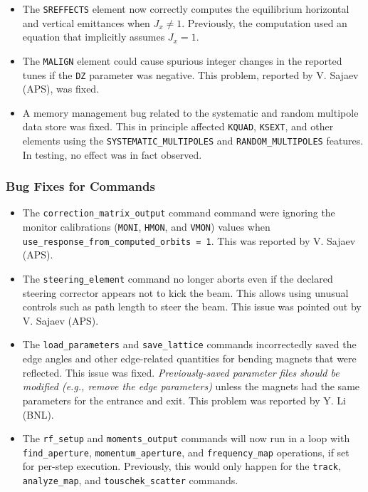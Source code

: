 \documentclass[11pt]{article}
\begin{document}
\begin{itemize}
\item The \verb|SREFFECTS| element now correctly computes the equilibrium horizontal and vertical emittances when
  $J_x \neq 1$. Previously, the computation used an equation that implicitly assumes $J_x = 1$.
\item The \verb|MALIGN| element could cause spurious integer changes in the reported tunes if the \verb|DZ| parameter
  was negative. This problem, reported by V. Sajaev (APS), was fixed.
\item A memory management bug related to the systematic and random multipole data store was fixed. This in principle
  affected \verb|KQUAD|, \verb|KSEXT|, and other elements using the \verb|SYSTEMATIC_MULTIPOLES| and \verb|RANDOM_MULTIPOLES|
  features. In testing, no effect was in fact observed.
\end{itemize}

\subsubsection{Bug Fixes for Commands}
\begin{itemize}
\item The \verb|correction_matrix_output| command command were ignoring the monitor calibrations
  (\verb|MONI|, \verb|HMON|, and \verb|VMON|) values when \verb|use_response_from_computed_orbits = 1|.
  This was reported by V. Sajaev (APS).
\item The \verb|steering_element| command no longer aborts even if the declared steering corrector appears 
  not to kick the beam. This allows using unusual controls such as path length to steer the beam. This
  issue was pointed out by V. Sajaev (APS).
\item The \verb|load_parameters| and \verb|save_lattice| commands incorrectedly saved the edge angles and other edge-related
  quantities for bending magnets that were reflected. This issue was fixed. {\em Previously-saved parameter files should be modified
  (e.g., remove the edge parameters)} unless the magnets had the same parameters for the entrance and exit. 
  This problem was reported by Y. Li (BNL).
\item The \verb|rf_setup| and \verb|moments_output| commands will now run in a loop with \verb|find_aperture|,
  \verb|momentum_aperture|, and \verb|frequency_map| operations, if set for per-step execution. Previously,
  this would only happen for the \verb|track|, \verb|analyze_map|, and \verb|touschek_scatter| commands.
\end{itemize}
\end{document}
